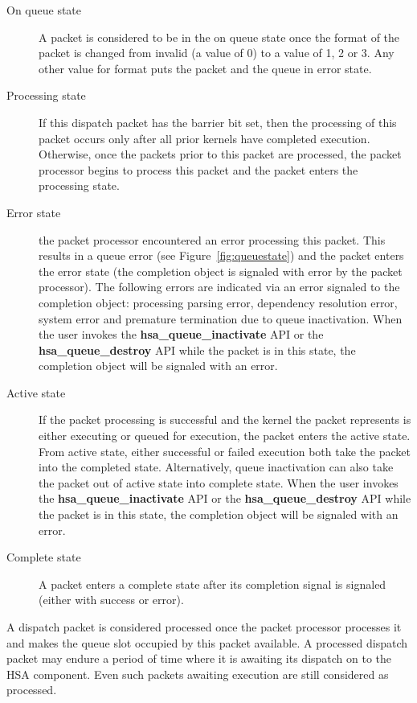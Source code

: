 \documentclass[draft]{book}
\newcommand{\reffun}[1]{\textbf{#1}}
\begin{document}
\begin{description}
\item[On queue state] A packet is considered to be in the on queue state once
  the format of the packet is changed from invalid (a value of 0) to a value of
  1, 2 or 3. Any other value for format puts the packet and the queue in error
  state.

\item[Processing state] If this dispatch packet has the barrier bit set, then
  the processing of this packet occurs only after all prior kernels have
  completed execution. Otherwise, once the packets prior to this packet are
  processed, the packet processor begins to process this packet and the packet
  enters the processing state.

\item[Error state] the packet processor encountered an error processing this
  packet. This results in a queue error (see Figure~\ref{fig:queuestate}) and
  the packet enters the error state (the completion object is signaled with
  error by the packet processor). The following errors are indicated via an
  error signaled to the completion object: processing parsing error, dependency
  resolution error, system error and premature termination due to queue
  inactivation. When the user invokes the \reffun{hsa_queue_inactivate} API
  or the \reffun{hsa_queue_destroy} API while the packet is in this state, the
  completion object will be signaled with an error.

\item[Active state] If the packet processing is successful and the kernel the
  packet represents is either executing or queued for execution, the packet
  enters the active state. From active state, either successful or failed
  execution both take the packet into the completed state. Alternatively, queue
  inactivation can also take the packet out of active state into complete state.
  When the user invokes the \reffun{hsa_queue_inactivate} API or the
  \reffun{hsa_queue_destroy} API while the packet is in this state, the
  completion object will be signaled with an error.

\item[Complete state] A packet enters a complete state after its completion
  signal is signaled (either with success or error).
\end{description}

A dispatch packet is considered processed once the packet processor processes it
and makes the queue slot occupied by this packet available. A processed dispatch
packet may endure a period of time where it is awaiting its dispatch on to the
HSA component. Even such packets awaiting execution are still considered as
processed.
\end{document}

